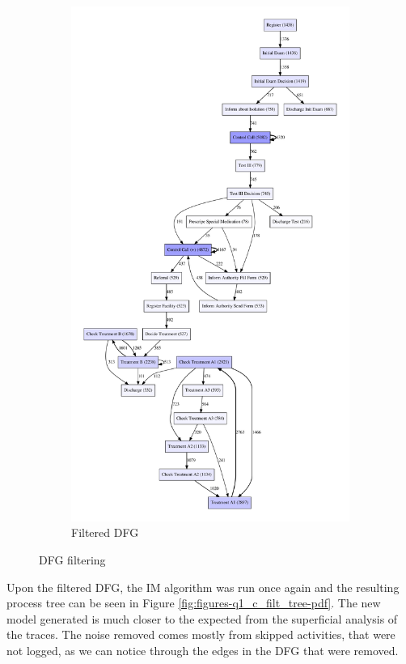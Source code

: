 \documentclass[12pt]{report}
\begin{document}
\begin{figure}[h]
\begin{subfigure}[b]{0.4\textwidth}
	\includegraphics[width=\textwidth]{figures/q1_c_dfg_filtered.pdf}
	\caption{Filtered DFG}
	\label{fig:subfigures-q1_c_dfg_filtered-pdf}
    \end{subfigure}
    \hfill
    \caption{DFG filtering}
    \label{fig:dfg-filtering}
\end{figure}

Upon the filtered DFG, the IM algorithm was run once again and the resulting process tree can be seen in Figure \ref{fig:figures-q1_c_filt_tree-pdf}. The new model generated is much closer to the expected from the superficial analysis of the traces. The noise removed comes mostly from skipped activities, that were not logged, as we can notice through the edges in the DFG that were removed.
\end{document}
